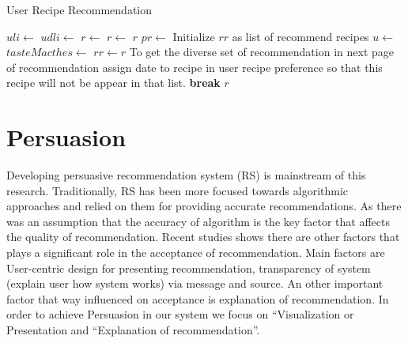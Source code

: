   \begin{algorithm}[H] 
  	\caption{User Recipe Recommendation}
  	\label{pseudo_rser_recipe_recommendation}
  	\begin{algorithmic}[1]
  		\State
			\State $uli\gets$ 
		    \State $udli\gets$ 
		    \State $r\gets$ 
		    \Else 
		    \State $r\gets$ 
		    \EndIf
		    \State \Return $r$
  	    \EndFunction
  	    \State
  	       \State $pr\gets$
  	        \State Initialize $rr$ as list of recommend recipes
  	        \State $u\gets$ 
  	        \State $tasteMacthes\gets$ 
	  	    \State  $rr \gets r$
	  	    \State To get the diverse set of recommendation in next page of recommendation assign date to recipe in user recipe preference so that this recipe will not be appear in that list. 
	  	    \EndIf
	  	    \State \textbf{break}
	  	    \EndIf
  	        \EndFor
		    \State \Return $r$
  	   \EndFunction
  	\end{algorithmic}
  \end{algorithm}
\newpage 
\section{Persuasion} \label{ch4_persuasion}

Developing persuasive recommendation system (RS) is mainstream of this research. Traditionally, RS has been more focused towards algorithmic approaches and relied on them for providing accurate recommendations. As there was an assumption that the accuracy of algorithm is the key factor that affects the quality of recommendation. Recent studies shows there are other factors that plays a significant role in the acceptance of recommendation. Main factors are User-centric design for presenting recommendation, transparency of system (explain user how system works) via message and source. An other important factor that way influenced on acceptance is explanation of recommendation\cite{gkika2014persuasive}. In order to achieve Persuasion in our system we focus on   “Visualization or Presentation \cite{nanou2010effects} \cite{pu2006trust} and “Explanation of recommendation\cite{cialdini2009influence}\cite{fogg1998persuasive}”.
  
